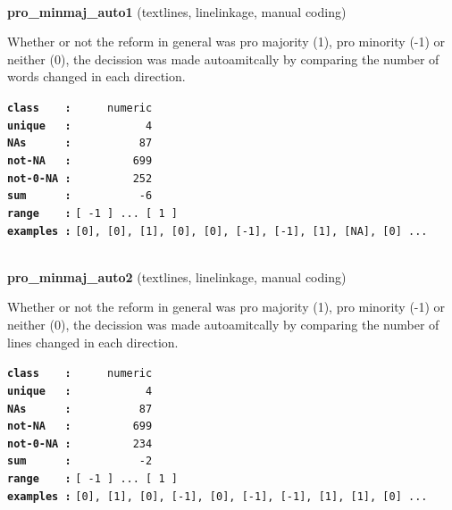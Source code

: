 \documentclass[]{article}
\begin{document}
~

\textbf{pro\_minmaj\_auto1} (textlines, linelinkage, manual coding)

Whether or not the reform in general was pro majority (1), pro minority
(-1) or neither (0), the decission was made autoamitcally by comparing
the number of words changed in each direction.

\textbf{\texttt{class\ \ \ \ :}} \texttt{~~~~~numeric}\\
\textbf{\texttt{unique\ \ \ :}} \texttt{~~~~~~~~~~~4}\\
\textbf{\texttt{NAs\ \ \ \ \ \ :}} \texttt{~~~~~~~~~~87}\\
\textbf{\texttt{not-NA\ \ \ :}} \texttt{~~~~~~~~~699}\\
\textbf{\texttt{not-0-NA\ :}} \texttt{~~~~~~~~~252}\\
\textbf{\texttt{sum\ \ \ \ \ \ :}} \texttt{~~~~~~~~~~-6}\\
\textbf{\texttt{range\ \ \ \ :}}
\texttt{{[}\ -1\ {]}\ ...\ {[}\ 1\ {]}}\\
\textbf{\texttt{examples\ :}}
\texttt{{[}0{]},\ {[}0{]},\ {[}1{]},\ {[}0{]},\ {[}0{]},\ {[}-1{]},\ {[}-1{]},\ {[}1{]},\ {[}NA{]},\ {[}0{]}\ ...}\\

~

\textbf{pro\_minmaj\_auto2} (textlines, linelinkage, manual coding)

Whether or not the reform in general was pro majority (1), pro minority
(-1) or neither (0), the decission was made autoamitcally by comparing
the number of lines changed in each direction.

\textbf{\texttt{class\ \ \ \ :}} \texttt{~~~~~numeric}\\
\textbf{\texttt{unique\ \ \ :}} \texttt{~~~~~~~~~~~4}\\
\textbf{\texttt{NAs\ \ \ \ \ \ :}} \texttt{~~~~~~~~~~87}\\
\textbf{\texttt{not-NA\ \ \ :}} \texttt{~~~~~~~~~699}\\
\textbf{\texttt{not-0-NA\ :}} \texttt{~~~~~~~~~234}\\
\textbf{\texttt{sum\ \ \ \ \ \ :}} \texttt{~~~~~~~~~~-2}\\
\textbf{\texttt{range\ \ \ \ :}}
\texttt{{[}\ -1\ {]}\ ...\ {[}\ 1\ {]}}\\
\textbf{\texttt{examples\ :}}
\texttt{{[}0{]},\ {[}1{]},\ {[}0{]},\ {[}-1{]},\ {[}0{]},\ {[}-1{]},\ {[}-1{]},\ {[}1{]},\ {[}1{]},\ {[}0{]}\ ...}\\

~
\end{document}
